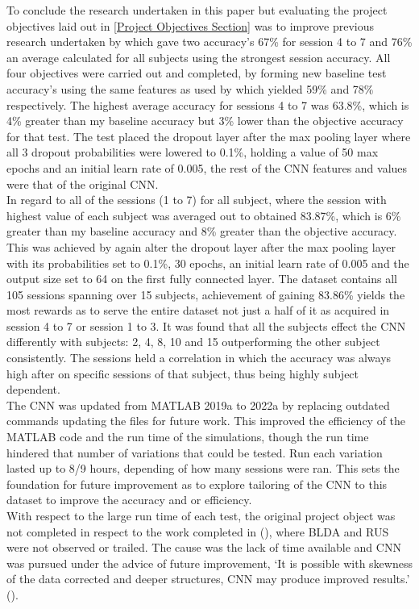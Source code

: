 To conclude the research undertaken in this paper but evaluating the project objectives laid out in \cref{Project Objectives Section} was to improve previous research undertaken by \cite{PalaniPaper} which gave two accuracy's 67\% for session 4 to 7 and 76\% an average calculated for all subjects using the strongest session accuracy. All four objectives were carried out and completed, by forming new baseline test accuracy's using the same features as used by \cite{PalaniPaper} which yielded 59\% and 78\% respectively. The highest average accuracy for sessions 4 to 7 was 63.8\%, which is 4\% greater than my baseline accuracy but 3\% lower than the objective accuracy for that test. The test placed the dropout layer after the max pooling layer where all 3 dropout probabilities were lowered to 0.1\%, holding a value of 50 max epochs and an initial learn rate of 0.005, the rest of the CNN features and values were that of the original CNN. \\


In regard to all of the sessions (1 to 7) for all subject, where the session with highest value of each subject was averaged out to obtained 83.87\%, which is 6\% greater than my baseline accuracy and 8\% greater than the objective accuracy. This was achieved by again alter the dropout layer after the max pooling layer with its probabilities set to 0.1\%, 30 epochs, an initial learn rate of 0.005 and the output size set to 64 on the first fully connected layer. The dataset contains all 105 sessions spanning over 15 subjects, achievement of gaining 83.86\% yields the most rewards as to serve the entire dataset not just a half of it as acquired in session 4 to 7 or session 1 to 3. It was found that all the subjects effect the CNN differently with subjects: 2, 4, 8, 10 and 15 outperforming the other subject consistently. The sessions held a correlation in which the accuracy was always high after on specific sessions of that subject, thus being highly subject dependent. \\

The CNN was updated from MATLAB 2019a to 2022a by replacing outdated commands updating the files for future work. This improved the efficiency of the MATLAB code and the run time of the simulations, though the run time hindered that number of variations that could be tested. Run each variation lasted up to 8/9 hours, depending of how many sessions were ran. This sets the foundation for future improvement as to explore tailoring of the CNN to this dataset to improve the accuracy and or efficiency. \\

With respect to the large run time of each test, the original project object was not completed in respect to the work completed in (\cite{PalaniPaper}), where BLDA and RUS were not observed or trailed. The cause was the lack of time available and CNN was pursued under the advice of future improvement, ‘It is possible with skewness of the data corrected and deeper structures, CNN may produce improved results.' (\cite{PalaniPaper}).
